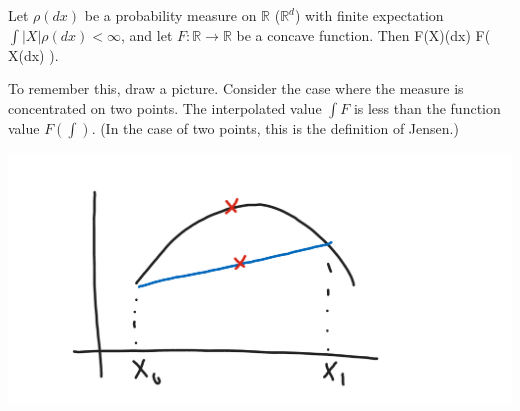 \documentclass[12pt]{book}
\theoremstyle{norm}
\begin{document}
\begin{theorem}
Let $\rho(dx)$ be a probability measure on $\mathbb{R}$ ($\mathbb{R}^d$) with finite expectation $\int |X| \rho(dx)<\infty$, and let $F:\mathbb{R}\to \mathbb{R}$ be a concave function. Then
\be
\int F(X)\rho(dx) \le F\left( {\int X\rho(dx)} \right).
\ee
\end{theorem}
To remember this, draw a picture. Consider the case where the measure is concentrated on two points. The interpolated value $\int F$ is less than the function value $F(\int)$. (In the case of two points, this is the definition of Jensen.)

\begin{center}\includegraphics[scale=.25]{images/3-1}\end{center}
\end{document}
